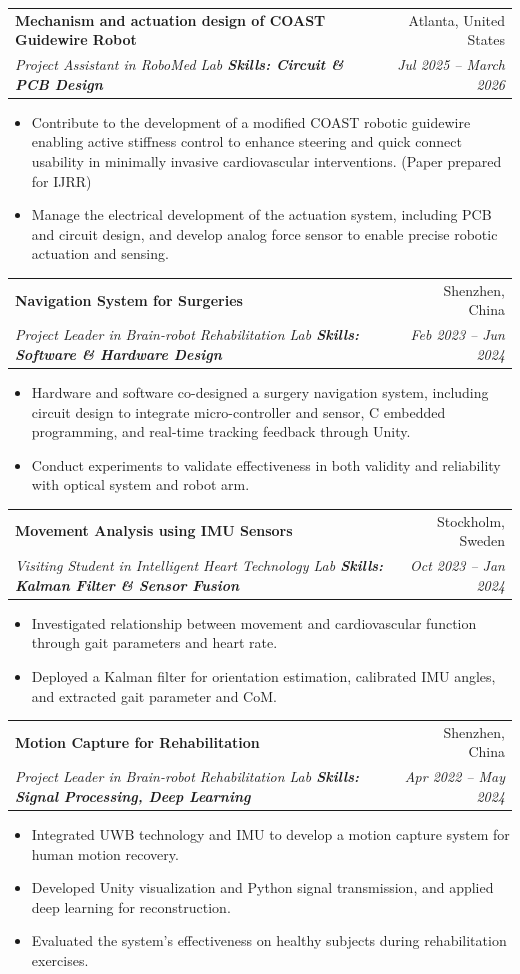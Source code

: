 \documentclass[letterpaper,11pt]{article}
\makeatletter
\newcommand{\resumeItem}[1]{
  \item\small{
    {#1 \vspace{-2pt}}
  }
}
\newcommand{\resumeSubheading}[4]{
  \vspace{-2pt}\item
    \begin{tabular*}{0.97\textwidth}[t]{l@{\extracolsep{\fill}}r}
      \textbf{#1} & #2 \\
      \textit{\small#3} & \textit{\small #4} \\
    \end{tabular*}\vspace{-7pt}
}
\newcommand{\resumeItemListStart}{\begin{itemize}}
\newcommand{\resumeItemListEnd}{\end{itemize}\vspace{-5pt}}
\makeatother
\begin{document}
\resumeSubheading
{Mechanism and actuation design of COAST Guidewire Robot}{Atlanta, United States}
{Project Assistant in RoboMed Lab \textbf{Skills: Circuit \& PCB Design}}{Jul 2025 -- March 2026}
\resumeItemListStart
\resumeItem{Contribute to the development of a modified COAST robotic guidewire enabling active stiffness control to enhance steering and quick connect usability in minimally invasive cardiovascular interventions. (Paper prepared for IJRR)}
\resumeItem{Manage the electrical development of the actuation system, including PCB and circuit design, and develop analog force sensor to enable precise robotic actuation and sensing.}
\resumeItemListEnd
\resumeSubheading
{Navigation System for Surgeries}{Shenzhen, China}
{Project Leader in Brain-robot Rehabilitation Lab \textbf{Skills: Software \& Hardware Design}}{Feb 2023 -- Jun 2024}
\resumeItemListStart
\resumeItem{Hardware and software co-designed a surgery navigation system, including circuit design to integrate micro-controller and sensor, C embedded programming, and real-time tracking feedback through Unity.}
\resumeItem{Conduct experiments to validate effectiveness in both validity and reliability with optical system and robot arm.}
\resumeItemListEnd

\resumeSubheading
{Movement Analysis using IMU Sensors}{Stockholm, Sweden}
{Visiting Student in Intelligent Heart Technology Lab \textbf{Skills: Kalman Filter \& Sensor Fusion}}{Oct 2023 -- Jan 2024}
\resumeItemListStart
\resumeItem{Investigated relationship between movement and cardiovascular function through gait parameters and heart rate.}
\resumeItem{Deployed a Kalman filter for orientation estimation, calibrated IMU angles, and extracted gait parameter and CoM.}
\resumeItemListEnd

\resumeSubheading
{Motion Capture for Rehabilitation}{Shenzhen, China}
{Project Leader in Brain-robot Rehabilitation Lab \textbf{Skills: Signal Processing, Deep Learning}}{Apr 2022 -- May 2024}
\resumeItemListStart
\resumeItem{Integrated UWB technology and IMU to develop a motion capture system for human motion recovery.}
\resumeItem{Developed Unity visualization and Python signal transmission, and applied deep learning for reconstruction.
}
\resumeItem{Evaluated the system’s effectiveness on healthy subjects during rehabilitation exercises.}
\resumeItemListEnd
\end{document}
